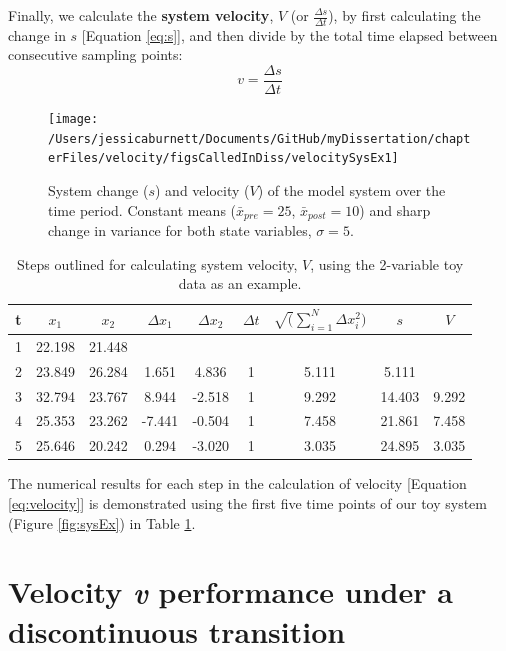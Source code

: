 \documentclass[12pt,twoside,openany]{reedthesis}
\begin{document}
Finally, we calculate the \textbf{system velocity}, \(V\) (or \(\frac{\Delta s}{\Delta t}\)), by first calculating the change in \(s\) {[}Equation \eqref{eq:s}{]}, and then divide by the total time elapsed between consecutive sampling points:
\begin{equation}
 v = \frac {\Delta s}{\Delta t} 
\label{eq:velocity}
\end{equation}
\begin{figure}[bth]

{\centering \texttt{[image: /Users/jessicaburnett/Documents/GitHub/myDissertation/chapterFiles/velocity/figsCalledInDiss/velocitySysEx1]} 

}

\caption{System change ($s$) and velocity ($V$) of the model system over the time period. Constant means ($\bar{x}_{pre}=25$, $\bar{x}_{post}=10$) and sharp change in variance for both state variables, $\sigma =5$.}\label{fig:velocSysEx1}
\end{figure}
\begin{table}[t]

\caption{\label{tab:distTab}Steps outlined for calculating system velocity, $V$, using the 2-variable toy data as an example.}
\centering
\begin{tabular}{ccccccccc}
\toprule
t & $x_1$ & $x_2$ & $\Delta x_1$ & $\Delta x_2$ & $\Delta t$ & $\sqrt(\sum_{i=1}^N \Delta x_i^2) $ & $s$ & $V$\\
\midrule
1 & 22.198 & 21.448 &  &  &  &  &  & \\
2 & 23.849 & 26.284 & 1.651 & 4.836 & 1 & 5.111 & 5.111 & \\
3 & 32.794 & 23.767 & 8.944 & -2.518 & 1 & 9.292 & 14.403 & 9.292\\
4 & 25.353 & 23.262 & -7.441 & -0.504 & 1 & 7.458 & 21.861 & 7.458\\
5 & 25.646 & 20.242 & 0.294 & -3.020 & 1 & 3.035 & 24.895 & 3.035\\
\bottomrule
\end{tabular}
\end{table}
The numerical results for each step in the calculation of velocity {[}Equation \eqref{eq:velocity}{]} is demonstrated using the first five time points of our toy system (Figure \ref{fig:sysEx}) in Table \ref{tab:distTab}.

\hypertarget{velocity-v-performance-under-a-discontinuous-transition}{%
\section{\texorpdfstring{Velocity \emph{v} performance under a discontinuous transition}{Velocity v performance under a discontinuous transition}}\label{velocity-v-performance-under-a-discontinuous-transition}}
\end{document}
